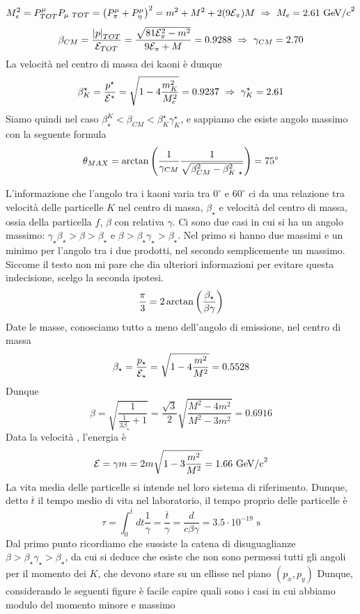 \documentclass[12pt,twoside,a4]{article}
\begin{document}
\begin{solution}
$$ M^2_e = P^\mu_{TOT} P_{\mu \mbox{ } TOT } = \left({P^\mu_\pi + P^\mu_\eta}\right)^2 = m^2 + M^2 + 2 (9 \mathcal{E}_\pi) M  \  \Rightarrow  \  M_e = 2.61 \mbox{ GeV/c} ^2$$
$$ \beta_{CM} = \frac{\left| {p} \right|_{TOT}}{\mathcal{E}_{TOT}} = \frac{\sqrt{81 \mathcal{E}^2_\pi - m^2}}{9 \mathcal{E}_\pi + M} = 0.9288  \  \Rightarrow  \  \gamma_{CM} = 2.70$$
La velocità  nel centro di massa dei kaoni è dunque
$$ \beta^\star_K = \frac{p^\star}{\mathcal{E}^\star} = \sqrt{1 - 4\frac{m^2_K}{M^2_e}} =
0.9237  \  \Rightarrow  \  \gamma^\star_K = 2.61
$$
Siamo quindi nel caso $ \beta_\star^K < \beta_{CM} < \beta^\star_K \gamma^\star_K$, e sappiamo che esiste angolo massimo con la seguente formula
$$ \theta_{MAX} = \arctan \left({ \frac{1}{\gamma_{CM}} \frac{1}{\sqrt{\beta^2_{CM} - \beta^2_{K \mbox{ } \star}}}}\right) = 75^\circ$$
\end{solution}


\begin{solution}
L'informazione che l'angolo tra i kaoni varia tra $0^\circ$ e $60^\circ$ ci da una relazione tra velocità  delle particelle $K$ nel centro di massa, $\beta_\star$ e velocità  del centro di massa, ossia della particella $f$, $\beta$ con relativa $\gamma$. Ci sono due casi in cui si ha un angolo massimo: $ \gamma_\star \beta_\star > \beta > \beta_\star$ e $\beta > \beta_\star \gamma_\star > \beta_\star$. Nel primo si hanno due massimi e un minimo per l'angolo tra i due prodotti, nel secondo semplicemente un massimo. Siccome il testo non mi pare che dia ulteriori informazioni per evitare questa indecisione, scelgo la seconda ipotesi.
$$ \frac{\pi}{3} = 2 \arctan \left({\frac{\beta_\star}{\beta \gamma}}\right)$$
Date le masse, conosciamo tutto a meno dell'angolo di emissione, nel centro di massa
$$ \beta_\star = \frac{p_\star}{\mathcal{E}_\star} = \sqrt{1 - 4\frac{m^2}{M^2}} = 0.5528$$
Dunque
$$ \beta = \sqrt{\frac{1}{\frac{1}{3 \beta_\star} + 1}} = 
\frac{\sqrt{3}}{2} \sqrt{\frac{M^2 - 4m^2}{M^2 -3 m^2}} = 0.6916$$
Data la velocità , l'energia è
$$ \mathcal{E} = \gamma m = 2m \sqrt{1 - 3\frac{m^2}{M^2}} = 1.66 \mbox{ GeV/c}^2$$
La vita media delle particelle si intende nel loro sistema di riferimento. Dunque, detto $\overline{t}$ il tempo medio di vita nel laboratorio, il tempo proprio delle particelle è
$$ \tau = \int_{0}^{\overline{t}} dt \frac{1}{\gamma} = \frac{\overline{t}}{\gamma} = \frac{d}{c \beta \gamma} = 3.5 \cdot 10^{-19} \mbox{ s}$$
Dal primo punto ricordiamo che sussiste la catena di disuguaglianze $\beta > \beta_\star \gamma_\star > \beta_\star$, da cui si deduce che esiste che non sono permessi tutti gli angoli per il momento dei $K$, che devono stare su un ellisse nel piano $(p_x, p_y)$
Dunque, considerando le seguenti figure è facile capire quali sono i casi in cui abbiamo modulo del momento minore e massimo


\end{solution}
\end{document}
